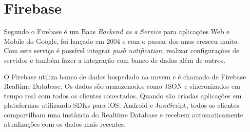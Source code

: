 \section{Firebase}
Segundo  o Firebase é um Baas \textit{Backend as a Service} para aplicações Web e Mobile do Google, foi lançado em 2004 e com o passar dos anos cresceu muito. Com este serviço é possível integrar \textit{push notification}, realizar configurações de servidor e também fazer a integração com banco de dados além de outros.

O Firebase utiliza banco de dados hospedado na nuvem e é chamado de Firebase Realtime Database. Os dados são armazenados como JSON e sincronizados em tempo real com todos os clientes conectados. Quando são criadas aplicações em plataformas utilizando SDKs para iOS, Android e JavaScript, todos os clientes compartilham uma instância do Realtime Database e recebem automaticamente atualizações com os dados mais recentes.  \cite{firebase1} 









